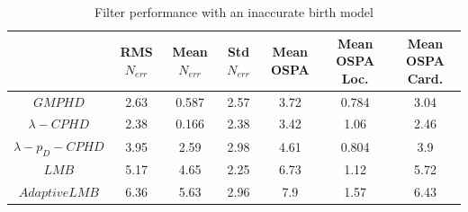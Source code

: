 \documentclass{article}
\begin{document}
\begin{table}[H]
  \centering
  \begin{tabular}{ c| c | c | c | c | c | c }
    & RMS $N_{err}$ & Mean $N_{err}$ & Std $N_{err}$ & Mean OSPA & Mean OSPA Loc. & Mean OSPA Card.\\
    \hline
    $GMPHD$ & 2.63 & 0.587 & 2.57 & 3.72 & 0.784 & 3.04 \\
    $\lambda-CPHD$ & 2.38 & 0.166 & 2.38 & 3.42 & 1.06 & 2.46 \\
    $\lambda-p_D-CPHD$ & 3.95 & 2.59 & 2.98 & 4.61 & 0.804 & 3.9 \\
    $LMB$ & 5.17 & 4.65 & 2.25 & 6.73 & 1.12 & 5.72 \\
    $Adaptive LMB$ & 6.36 & 5.63 & 2.96 & 7.9 & 1.57 & 6.43 \\
  \end{tabular}
  \caption{Filter performance with an inaccurate birth model}
  \label{tab:}
\end{table}
\end{document}
